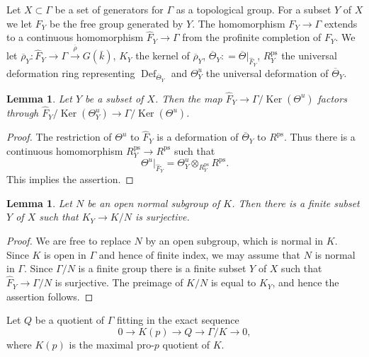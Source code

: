 \documentclass{amsart}
\newtheorem{lem}[prop]{Lemma}
\theoremstyle{definition}
\theoremstyle{remark}
\DeclareMathOperator{\Ker}{Ker}
\DeclareMathOperator{\Def}{Def}
\newcommand{\rhobar}{\overline{\rho}}
\newcommand{\kbar}{\bar{k}}
\newcommand{\Thetabar}{\overline{\Theta}}
\newcommand{\ps}{\mathrm{ps}}
\newcommand{\Fhat}{\widehat{F}}
\begin{document}
Let $X\subset \Gamma$ be a set of generators for $\Gamma$ as a topological group. For a subset $Y$ of $X$ we let 
$F_Y$ be the free group generated by $Y$. The homomorphism $F_Y \rightarrow \Gamma$ extends to a continuous homomorphism $\Fhat_Y \rightarrow\Gamma$ from the profinite completion of $F_Y$. 
We let $\rhobar_Y: \Fhat_Y \rightarrow \Gamma\overset{\rhobar}{\longrightarrow}
G(\kbar)$, $K_Y$ the kernel of $\rhobar_Y$, $\Thetabar_Y: = \Thetabar|_{\Fhat_Y}$, $R^{\ps}_Y$ the universal deformation ring representing $\Def_{\Thetabar_Y}$ and $\Theta^u_Y$ the universal deformation of $\Thetabar_Y$. 



\begin{lem}\label{factor_thru} Let $Y$ be a subset of $X$. Then the 
map $\Fhat_Y \rightarrow \Gamma/\Ker(\Theta^u)$ factors through 
$\Fhat_Y/\Ker(\Theta^u_Y)\rightarrow \Gamma /\Ker(\Theta^u)$. 
\end{lem}
\begin{proof}The restriction of 
$\Theta^u$ to $\Fhat_Y$ is a deformation of $\Thetabar_Y$ to $R^{\ps}$. Thus 
there is a continuous homomorphism 
$R^{\ps}_Y \rightarrow R^{\ps}$ such 
that 
\begin{equation}
\Theta^u|_{\Fhat_Y} = \Theta^u_Y \otimes_{R^{\ps}_Y} R^{\ps}.
\end{equation}
This implies the assertion.
\end{proof}

\begin{lem}\label{dense_Y} 
Let $N$ be an open normal subgroup of $K$. Then there is a finite subset 
$Y$ of $X$ such that $K_Y\rightarrow K/N$ is surjective.
\end{lem} 
\begin{proof} We are free to replace 
$N$ by an open subgroup, 
which is normal in $K$.
Since $K$ is open in $\Gamma$ 
and hence of finite index, we may 
assume that $N$ is normal in $\Gamma$. Since  $\Gamma/N$ is a finite group there is a finite subset $Y$ of $X$ such that $\Fhat_Y\rightarrow \Gamma/N$ is 
surjective. The preimage of $K/N$ is 
equal to $K_Y$, and hence the assertion follows.
\end{proof}
Let $Q$ be a quotient of $\Gamma$ fitting in the exact sequence
\begin{equation}\label{def_Q}
0\rightarrow K(p)\rightarrow Q\rightarrow \Gamma/K\rightarrow 0,
\end{equation}
where $K(p)$ is the maximal pro-$p$ quotient of $K$.
\end{document}
